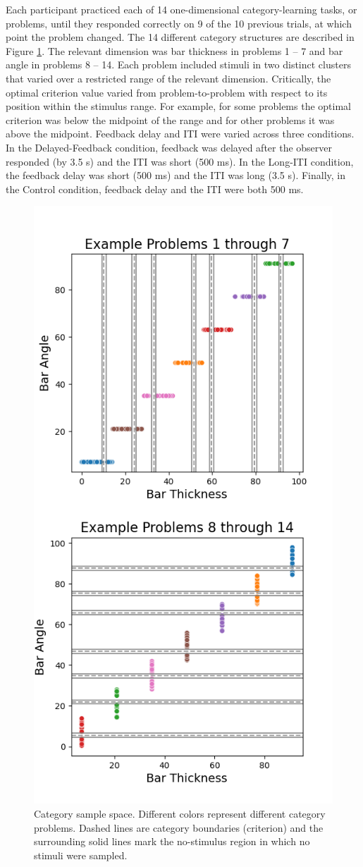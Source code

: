 \documentclass[doc, floatsintext]{apa7}
\begin{document}
Each participant practiced each of 14 one-dimensional
category-learning tasks, or problems, until they responded
correctly on 9 of the 10 previous trials, at which point the
problem changed. The 14 different category structures are
described in Figure \ref{fig_design_exp_1_space}. The
relevant dimension was bar thickness in problems 1 -- 7 and
bar angle in problems 8 -- 14. Each problem included stimuli
in two distinct clusters that varied over a restricted range
of the relevant dimension. Critically, the optimal criterion
value varied from problem-to-problem with respect to its
position within the stimulus range. For example, for some
problems the optimal criterion was below the midpoint of the
range and for other problems it was above the midpoint.
Feedback delay and ITI were varied across three conditions.
In the Delayed-Feedback condition, feedback was delayed
after the observer responded (by 3.5 s) and the ITI was
short (500 ms). In the Long-ITI condition, the feedback
delay was short (500 ms) and the ITI was long (3.5 s).
Finally, in the Control condition, feedback delay and the
ITI were both 500 ms.

\begin{figure}
  \centering
  \includegraphics[width=.5\textwidth]{../figures/fig_design_exp_1_space.png}
  \caption{
      Category sample space. Different colors represent
      different category problems. Dashed lines are category
      boundaries (criterion) and the surrounding solid lines
      mark the no-stimulus region in which no stimuli were
      sampled.
}
  \label{fig_design_exp_1_space}
\end{figure}
\end{document}
